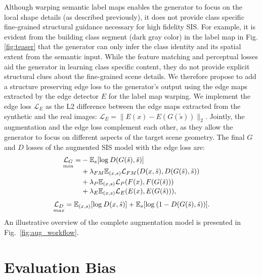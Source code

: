 \documentclass[final]{cvpr}
\newcommand\+{\mkern4mu}
\begin{document}
Although warping semantic label maps enables the generator to focus on the local shape details (as described previously), it does not provide class specific fine-grained structural guidance necessary for high fidelity SIS. For example, it is evident from the building class segment (dark gray color) in the label map in Fig. \ref{fig:teaser} that the generator can only infer the class identity and its spatial extent from the semantic input. While the feature matching and perceptual losses aid the generator in learning class specific content, they do not provide explicit structural clues about the fine-grained scene details. 
We therefore propose to add a structure preserving edge loss \cite{khoreva2021} to the generator's output using the edge maps extracted by the edge detector $E$ for the label map warping. 
We implement the edge loss $\mathcal{L}_{E}$ as the L2 difference between the edge maps extracted from the synthetic and the real images: $\mathcal{L}_{E} = \lVert E(x) - E(G(\tilde{s})) \rVert_2$.
Jointly, the augmentation and the edge loss complement each other, as they allow the generator to focus on different aspects of the target scene geometry. The final $G$ and $D$ losses of the augmented SIS model with the edge loss are: 
\begin{equation}
\begin{aligned}
\underset{min}{\mathcal{L}_G} = & -\mathbb{E}_{s}[\text{log}\+ D(G(\tilde{s}), \tilde{s})] \\[-5pt]
& + \lambda_{FM} \mathbb{E}_{(x, s)} \mathcal{L}_{FM}(D(x, \tilde{s}), D(G(\tilde{s}), \tilde{s}))\\
& + \lambda_{P} \mathbb{E}_{(x, s)} \mathcal{L}_{P}(F(x), F(G(\tilde{s}))) \\[-2pt]
& + \lambda_{E} \mathbb{E}_{(x, s)} \mathcal{L}_{E}(E(x), E(G(\tilde{s})))\text{,}
\end{aligned}
\end{equation}\vspace{-10pt}
\begin{align*}
\underset{max}{\mathcal{L}_D} = \mathbb{E}_{(x, s)}[\text{log}\+ D(x, \tilde{s})] + \mathbb{E}_{s}[\text{log}\+ (1 - D(G(\tilde{s}), \tilde{s}))]\text{.}
\end{align*}
An illustrative overview of the complete augmentation model is presented in Fig.~\ref{fig:aug_workflow}.  	
	\section{Evaluation Bias}
\label{sec:evaluation_bias}
\end{document}
